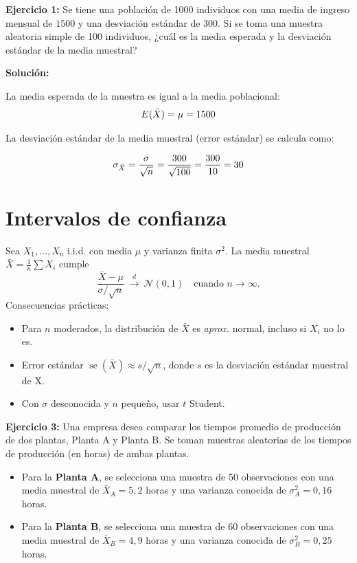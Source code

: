 \documentclass[10pt,a4paper]{article}
\begin{document}
\textbf{Ejercicio 1:} Se tiene una población de 1000 individuos con una media de ingreso mensual de $1500$ y una desviación estándar de $300$. Si se toma una muestra aleatoria simple de 100 individuos, ¿cuál es la media esperada y la desviación estándar de la media muestral?

{\color{red} \textbf{Solución:}

La media esperada de la muestra es igual a la media poblacional:
$$E(\Bar{X}) = \mu = 1500$$


La desviación estándar de la media muestral (error estándar) se calcula como:

$$\sigma_{\Bar{X}} = \frac{\sigma}{\sqrt{n}} = \frac{300}{\sqrt{100}} = \frac{300}{10} = 30$$}



\section{Intervalos de confianza}

Sea $X_1,\ldots,X_n$ i.i.d. con media $\mu$ y varianza finita $\sigma^2$. La media muestral $\bar X=\frac{1}{n}\sum X_i$ cumple
\[
\frac{\bar{ X}-\mu}{\sigma/\sqrt{n}} \ \xrightarrow{d}\ \mathcal{N}(0,1)\quad \text{cuando } n\to\infty.
\]
Consecuencias prácticas:
\begin{itemize}
  \item Para $n$ moderados, la distribución de $\bar{X}$ es \emph{aprox.} normal, incluso si $X_i$ no lo es.
  \item Error estándar $\operatorname{se}(\bar{X})\approx s/\sqrt{n}$, donde $s$ es la desviación estándar muestral de X.
  \item Con $\sigma$ desconocida y $n$ pequeño, usar $t$ Student.
\end{itemize}

\textbf{Ejercicio 3:} Una empresa desea comparar los tiempos promedio de producción de dos plantas, Planta A y Planta B. Se toman muestras aleatorias de los tiempos de producción (en horas) de ambas plantas.

\begin{itemize}
    \item Para la \textbf{Planta A}, se selecciona una muestra de 50 observaciones con una media muestral de \( \bar{X}_A = 5,2 \) horas y una varianza conocida de \( \sigma_A^2 = 0,16 \) horas.
    \item Para la \textbf{Planta B}, se selecciona una muestra de 60 observaciones con una media muestral de \( \bar{X}_B = 4,9 \) horas y una varianza conocida de \( \sigma_B^2 = 0,25 \) horas.
\end{itemize}
\end{document}
